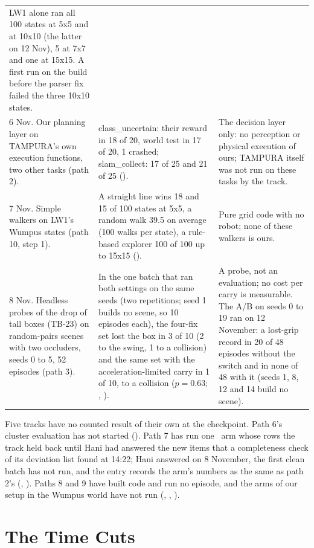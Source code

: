 \begin{small}
\begin{longtable}{@{}P{0.30\textwidth}P{0.36\textwidth}P{0.28\textwidth}@{}}
LW1 alone ran all 100 states at 5x5 and at 10x10 (the latter on 12 Nov), 5 at 7x7 and
one at 15x15. A first run on the build before the parser fix failed the three 10x10
states. \\
6 Nov. Our planning layer on TAMPURA's own execution functions, two other tasks
(path 2). &
class\_uncertain: their reward in 18 of 20, world test in 17 of 20, 1 crashed;
slam\_collect: 17 of 25 and 21 of 25 (). &
The decision layer only: no perception or physical execution of ours; TAMPURA
itself was not run on these tasks by the track. \\
7 Nov. Simple walkers on LW1's Wumpus states (path 10, step 1). &
A straight line wins 18 and 15 of 100 states at 5x5, a random walk 39.5 on average (100 walks per state), a
rule-based explorer 100 of 100 up to 15x15 (). &
Pure grid code with no robot; none of these walkers is ours. \\
8 Nov. Headless probes of the drop of tall boxes (TB-23) on random-pairs scenes with two
occluders, seeds 0 to 5, 52 episodes (path 3). &
In the one batch that ran both settings on the same seeds (two repetitions; seed 1 builds no
scene, so 10 episodes each), the four-fix set lost the box in 3 of 10 (2 to the swing, 1 to a
collision) and the same set with the acceleration-limited carry in 1 of 10, to a collision
($p = 0.63$; , ). &
A probe, not an evaluation; no cost per carry is measurable. The A/B on seeds 0 to 19 ran on
12 November: a lost-grip record in 20 of 48 episodes without the switch and in none of 48
with it (seeds 1, 8, 12 and 14 build no scene). \\
\end{longtable}
\end{small}

Five tracks have no counted result of their own at the checkpoint. Path 6's cluster evaluation has not
started (). Path 7 has run one \cuncert\ arm whose rows the
track held back until Hani had answered the new items that a completeness check of its
deviation list found at 14:22; Hani answered on 8 November, the first clean batch has not
run, and the entry records the arm's numbers as the same as path 2's (, ).
Paths 8 and 9 have built code and run no episode, and the arms of our setup in the Wumpus
world have not run (, , ).

\section{The Time Cuts}
\label{sec:time-cuts}

